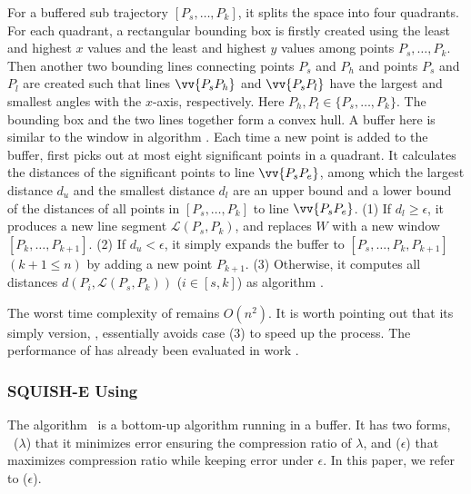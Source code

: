 For a buffered sub trajectory $[P_s, \ldots, P_k]$, it splits the space into four quadrants. For each quadrant, a rectangular bounding box is firstly created using the least and highest $x$ values and the least and highest $y$ values among points $P_s,\ldots,P_k$. Then another two bounding lines connecting points $P_s$ and $P_{h}$ and points $P_s$ and $P_{l}$ are created such that lines $\vv{P_sP_{h}}$ and $\vv{P_sP_{l}}$ have the largest and smallest angles with the $x$-axis, respectively.
Here $P_{h},P_{l} \in\{P_s,\ldots,P_k\}$. The bounding box and the two lines together form a convex hull.
A buffer here is similar to the window in algorithm \opwa\cite{Meratnia:Spatiotemporal}.
Each time a new point is added to the buffer, \bqsa first picks out at most eight significant points in a quadrant. It calculates the distances of the significant points to line $\vv{P_sP_e}$, among which the largest distance $d_{u}$ and the smallest distance $d_l$ are an upper bound and  a lower bound of the distances of all points in $[P_s, \ldots, P_k]$ to line $\vv{P_sP_e}$.
(1) If $d_l\ge \epsilon$, it produces a new line segment $\mathcal{L}(P_{s}, P_{k})$, and replaces $W$ with a new window $[P_{k},\ldots,P_{k+1}]$.
(2) If $d_u < \epsilon$, it simply expands the buffer to $[P_s, \ldots, P_k, P_{k+1}]$ $(k+1\le n)$ by adding a new point $P_{k+1}$.
(3) Otherwise, it computes all distances $d(P_i, {\mathcal{L}(P_s,P_k)})$ ($i\in[s, k]$) as algorithm \dpa.

The worst time complexity of \bqsa remains $O(n^2)$.
It is worth pointing out that its simply version, \fbqsa, essentially avoids case (3) to speed up the process. The performance of \fbqsa has already been evaluated in work \cite{Lin:Operb}. %



\vspace{-0.5ex}
\subsubsection{SQUISH-E Using \sed}

The \squishe algorithm~\cite{Muckell:Compression} is a bottom-up algorithm running in a buffer. It has two forms, \ie~\squishe($\lambda$) that it minimizes \sed error ensuring the compression ratio of $\lambda$, and \squishe($\epsilon$) that maximizes compression ratio while keeping \sed error under $\epsilon$. In this paper, we refer to \squishe($\epsilon$).


